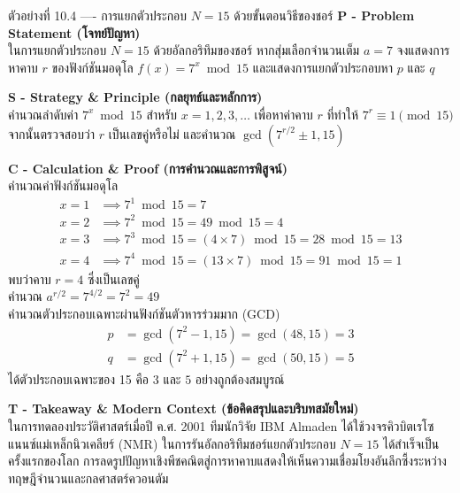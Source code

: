 \begin{psctbox}{ตัวอย่างที่ 10.4 ---- การแยกตัวประกอบ $N=15$ ด้วยขั้นตอนวิธีของชอร์}
\noindent\textbf{P - Problem Statement (โจทย์ปัญหา)} \\
ในการแยกตัวประกอบ $N=15$ ด้วยอัลกอริทึมของชอร์ หากสุ่มเลือกจำนวนเต็ม $a=7$ จงแสดงการหาคาบ $r$ ของฟังก์ชันมอดุโล $f(x) = 7^x \bmod 15$ และแสดงการแยกตัวประกอบหา $p$ และ $q$

\vspace{4pt}
\noindent\textbf{S - Strategy \& Principle (กลยุทธ์และหลักการ)} \\
คำนวณลำดับค่า $7^x \bmod 15$ สำหรับ $x = 1, 2, 3, \dots$ เพื่อหาค่าคาบ $r$ ที่ทำให้ $7^r \equiv 1 \pmod{15}$ จากนั้นตรวจสอบว่า $r$ เป็นเลขคู่หรือไม่ และคำนวณ $\gcd(7^{r/2} \pm 1, 15)$

\vspace{4pt}
\noindent\textbf{C - Calculation \& Proof (การคำนวณและการพิสูจน์)} \\
คำนวณค่าฟังก์ชันมอดุโล
\begin{align}
x = 1 &\implies 7^1 \bmod 15 = 7 \\
x = 2 &\implies 7^2 \bmod 15 = 49 \bmod 15 = 4 \\
x = 3 &\implies 7^3 \bmod 15 = (4 \times 7) \bmod 15 = 28 \bmod 15 = 13 \\
x = 4 &\implies 7^4 \bmod 15 = (13 \times 7) \bmod 15 = 91 \bmod 15 = 1
\end{align}
พบว่าคาบ $r = 4$ ซึ่งเป็นเลขคู่ \\
คำนวณ $a^{r/2} = 7^{4/2} = 7^2 = 49$ \\
คำนวณตัวประกอบเฉพาะผ่านฟังก์ชันตัวหารร่วมมาก (GCD)
\begin{align}
p &= \gcd(7^2 - 1, 15) = \gcd(48, 15) = 3 \\
q &= \gcd(7^2 + 1, 15) = \gcd(50, 15) = 5
\end{align}
ได้ตัวประกอบเฉพาะของ 15 คือ $3$ และ $5$ อย่างถูกต้องสมบูรณ์

\vspace{4pt}
\noindent\textbf{T - Takeaway \& Modern Context (ข้อคิดสรุปและบริบทสมัยใหม่)} \\
ในการทดลองประวัติศาสตร์เมื่อปี ค.ศ. 2001 ทีมนักวิจัย IBM Almaden ได้ใช้วงจรคิวบิตเรโซแนนซ์แม่เหล็กนิวเคลียร์ (NMR) ในการรันอัลกอริทึมชอร์แยกตัวประกอบ $N=15$ ได้สำเร็จเป็นครั้งแรกของโลก การลดรูปปัญหาเชิงพีชคณิตสู่การหาคาบแสดงให้เห็นความเชื่อมโยงอันลึกซึ้งระหว่างทฤษฎีจำนวนและกลศาสตร์ควอนตัม
\end{psctbox}

